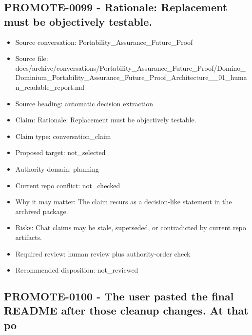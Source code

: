 \documentclass[11pt,a4paper]{report}
\begin{document}
\subsection{PROMOTE-0099 - Rationale: Replacement must be objectively testable.}

\begin{itemize}
\item Source conversation: Portability\_Assurance\_Future\_Proof
\item Source file: docs/archive/conversations/Portability\_Assurance\_Future\_Proof/Domino\_Dominium\_Portability\_Assurance\_Future\_Proof\_Architecture\_\_01\_human\_readable\_report.md
\item Source heading: automatic decision extraction
\item Claim: Rationale: Replacement must be objectively testable.
\item Claim type: conversation\_claim
\item Proposed target: not\_selected
\item Authority domain: planning
\item Current repo conflict: not\_checked
\item Why it may matter: The claim recurs as a decision-like statement in the archived package.
\item Risks: Chat claims may be stale, superseded, or contradicted by current repo artifacts.
\item Required review: human review plus authority-order check
\item Recommended disposition: not\_reviewed
\end{itemize}

\subsection{PROMOTE-0100 - The user pasted the final README after those cleanup changes. At that po}
\end{document}
